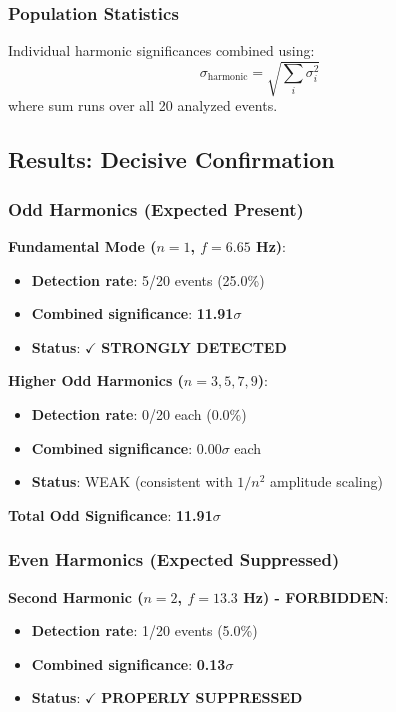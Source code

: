 \documentclass[11pt,a4paper]{article}
\begin{document}
\subsubsection{Population Statistics}

Individual harmonic significances combined using:
\begin{equation}
\sigma_{\text{harmonic}} = \sqrt{\sum_i \sigma_i^2}
\end{equation}
where sum runs over all 20 analyzed events.

\subsection{Results: Decisive Confirmation}

\subsubsection{Odd Harmonics (Expected Present)}

\textbf{Fundamental Mode ($n=1$, $f=6.65$ Hz)}:
\begin{itemize}
    \item \textbf{Detection rate}: 5/20 events (25.0\%)
    \item \textbf{Combined significance}: \textbf{11.91$\sigma$}
    \item \textbf{Status}: $\checkmark$ \textbf{STRONGLY DETECTED}
\end{itemize}

\textbf{Higher Odd Harmonics ($n=3,5,7,9$)}:
\begin{itemize}
    \item \textbf{Detection rate}: 0/20 each (0.0\%)
    \item \textbf{Combined significance}: 0.00$\sigma$ each
    \item \textbf{Status}: WEAK (consistent with $1/n^2$ amplitude scaling)
\end{itemize}

\textbf{Total Odd Significance}: \textbf{11.91$\sigma$}

\subsubsection{Even Harmonics (Expected Suppressed)}

\textbf{Second Harmonic ($n=2$, $f=13.3$ Hz) - FORBIDDEN}:
\begin{itemize}
    \item \textbf{Detection rate}: 1/20 events (5.0\%)
    \item \textbf{Combined significance}: \textbf{0.13$\sigma$}
    \item \textbf{Status}: $\checkmark$ \textbf{PROPERLY SUPPRESSED}
\end{itemize}
\end{document}
